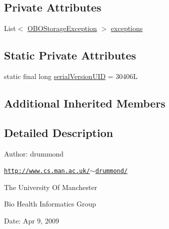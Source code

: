 \subsection*{Private Attributes}
\begin{DoxyCompactItemize}
\item 
List$<$ \hyperlink{classorg_1_1coode_1_1owlapi_1_1obo_1_1renderer_1_1_o_b_o_storage_exception}{O\-B\-O\-Storage\-Exception} $>$ \hyperlink{classorg_1_1coode_1_1owlapi_1_1obo_1_1renderer_1_1_o_b_o_storage_incomplete_exception_a8a65c3684f3cc8d13c26409ca8fbb412}{exceptions}
\end{DoxyCompactItemize}
\subsection*{Static Private Attributes}
\begin{DoxyCompactItemize}
\item 
static final long \hyperlink{classorg_1_1coode_1_1owlapi_1_1obo_1_1renderer_1_1_o_b_o_storage_incomplete_exception_a5f735a839b99ec52a744c72900cc9b22}{serial\-Version\-U\-I\-D} = 30406\-L
\end{DoxyCompactItemize}
\subsection*{Additional Inherited Members}


\subsection{Detailed Description}
Author\-: drummond\par
 \href{http://www.cs.man.ac.uk/~drummond/}{\tt http\-://www.\-cs.\-man.\-ac.\-uk/$\sim$drummond/}\par
\par
 

The University Of Manchester\par
 Bio Health Informatics Group\par
 Date\-: Apr 9, 2009\par
\par
 

